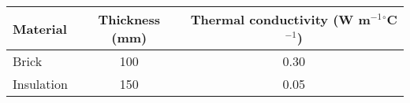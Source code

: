 \begin{center}
\begin{tabular}{|l|c|c|}
\hline
\textbf{Material}  & \textbf{Thickness (mm)} & \textbf{Thermal conductivity} (W m$^{-1} {}^\circ$C$^{-1}$) \\
\hline
Brick      & 100 & 0.30 \\
Insulation & 150 & 0.05 \\
\hline
\end{tabular}
\end{center}